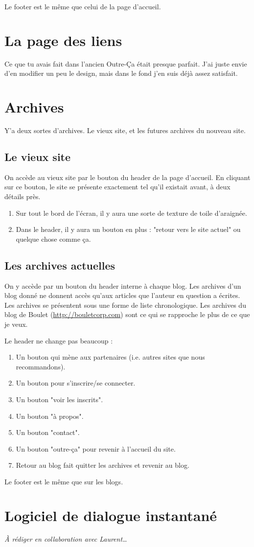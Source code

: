\documentclass[french]{report}
\theoremstyle{plain}
\begin{document}
		Le footer est le même que celui de la page d'accueil.

\chapter{La page des liens}
	Ce que tu avais fait dans l'ancien Outre-Ça était presque parfait. J'ai juste envie d'en modifier un peu le design, mais dans le fond j'en suis déjà assez satisfait.

\chapter{Archives}
	Y'a deux sortes d'archives. Le vieux site, et les futures archives du nouveau site.
	\section{Le vieux site}
		On accède au vieux site par le bouton du header de la page d'accueil. En cliquant sur ce bouton, le site se présente exactement tel qu'il existait avant, à deux détails près. 
		\begin{enumerate}
			\item Sur tout le bord de l'écran, il y aura une sorte de texture de toile d'araignée.
			\item Dans le header, il y aura un bouton en plus : "retour vers le site actuel" ou quelque chose comme ça. 
		\end{enumerate}

	\section{Les archives actuelles}
		On y accède par un bouton du header interne à chaque blog. Les archives d'un blog donné ne donnent accès qu'aux articles que l'auteur en question a écrites. Les archives se présentent sous une forme de liste chronologique. Les archives du blog de Boulet (\url{http://bouletcorp.com}) sont ce qui se rapproche le plus de ce que je veux. 

		Le header ne change pas beaucoup :
		\begin{enumerate}
			\item Un bouton qui mène aux partenaires (i.e. autres sites que nous recommandons).
			\item Un bouton pour s'inscrire/se connecter.
			\item Un bouton "voir les inscrits".			
			\item Un bouton "à propos".
			\item Un bouton "contact".
			\item Un bouton "outre-ça" pour revenir à l'accueil du site.
			\item Retour au blog fait quitter les archives et revenir au blog.
		\end{enumerate}

		Le footer est le même que sur les blogs.


\chapter{Logiciel de dialogue instantané} \label{dialogue}
	\emph{À rédiger en collaboration avec Laurent\ldots}
\end{document}
